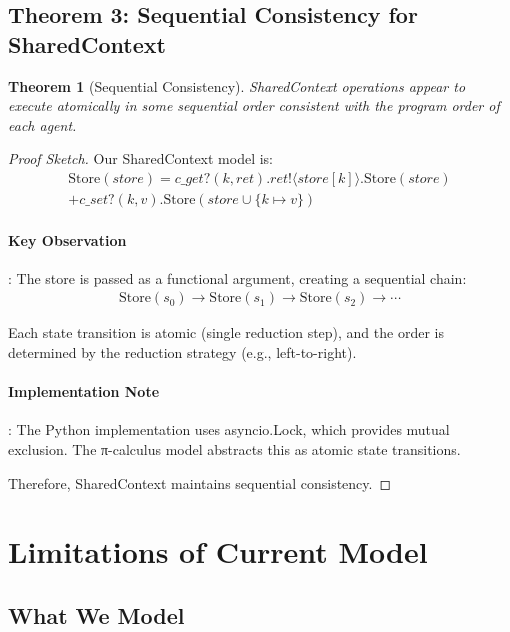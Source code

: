 \documentclass{article}
\newtheorem{theorem}{Theorem}
\begin{document}
\subsection{Theorem 3: Sequential Consistency for SharedContext}

\begin{theorem}[Sequential Consistency]
SharedContext operations appear to execute atomically in some sequential order consistent with the program order of each agent.
\end{theorem}

\begin{proof}[Proof Sketch]
Our SharedContext model is:
\begin{align*}
\text{Store}(store) = c\_get?(k, ret).ret!\langle store[k] \rangle.\text{Store}(store) \\
                     + c\_set?(k, v).\text{Store}(store \cup \{k \mapsto v\})
\end{align*}

\paragraph{Key Observation}: The store is passed as a functional argument, creating a sequential chain:
\begin{align*}
\text{Store}(s_0) \to \text{Store}(s_1) \to \text{Store}(s_2) \to \cdots
\end{align*}

Each state transition is atomic (single reduction step), and the order is determined by the reduction strategy (e.g., left-to-right).

\paragraph{Implementation Note}: The Python implementation uses asyncio.Lock, which provides mutual exclusion. The π-calculus model abstracts this as atomic state transitions.

Therefore, SharedContext maintains sequential consistency.
\end{proof}

\section{Limitations of Current Model}

\subsection{What We Model}
\end{document}
